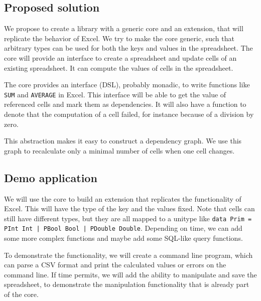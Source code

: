 \documentclass{article}
\begin{document}
	\subsection{Proposed solution}
	We propose to create a library with a generic core and an extension, that will replicate the behavior of Excel. We try to make the core generic, such that arbitrary types can be used for both the keys and values in the spreadsheet. The core will provide an interface to create a spreadsheet and update cells of an existing spreadsheet. It can compute the values of cells in the spreadsheet.
	
	The core provides an interface (DSL), probably monadic, to write functions like \texttt{SUM} and \texttt{AVERAGE} in Excel. This interface will be able to get the value of referenced cells and mark them as dependencies. It will also have a function to denote that the computation of a cell failed, for instance because of a division by zero.
	
	This abstraction makes it easy to construct a dependency graph. We use this graph to recalculate only a minimal number of cells when one cell changes.
	
	
	\subsection{Demo application}
	We will use the core to build an extension that replicates the functionality of Excel. This will have the type of the key and the values fixed. Note that cells can still have different types, but they are all mapped to a unitype like \texttt{data Prim = PInt Int | PBool Bool | PDouble Double}. Depending on time, we can add some more complex functions and maybe add some SQL-like query functions.
	
	To demonstrate the functionality, we will create a command line program, which can parse a CSV format and print the calculated values or errors on the command line. If time permits, we will add the ability to manipulate and save the spreadsheet, to demonstrate the manipulation functionality that is already part of the core.
	
\end{document}
